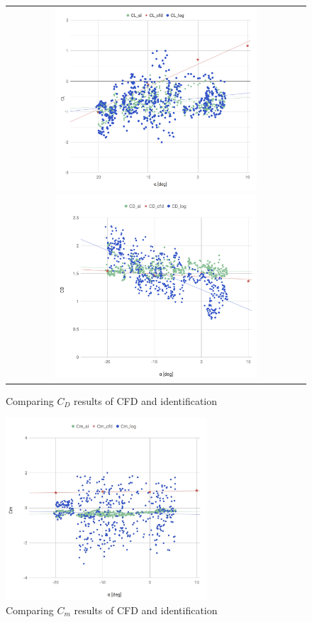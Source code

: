 \begin{figure}[htbp]
	\centering
		\begin{tabular}{c}
			\begin{minipage}{0.5\hsize}
				\centering
					\includegraphics[clip,width=7.5cm,bb=0 0 1912 1743]{./z_figure_files/chapter5/cfd_L.jpeg}
					\caption{Comparing $C_L$ results of CFD and identification}
					\label{fig:cfd_L}
			\end{minipage}
			\begin{minipage}{0.5\hsize}
				\centering
					\includegraphics[clip,width=7.5cm,bb=0 0 1819 1662]{./z_figure_files/chapter5/cfd_D.jpeg}
					\caption{Comparing $C_D$ results of CFD and identification}
					\label{fig:cfd_D}
			\end{minipage}
		\end{tabular}
\end{figure}
\begin{figure}[H]
  \centering
    \includegraphics[clip,width=7.5cm,bb=0 0 1832 1662]{./z_figure_files/chapter5/cfd_m.jpeg}
    \caption{Comparing $C_m$ results of CFD and identification}
    \label{fig:cfd_Ma}
\end{figure}
